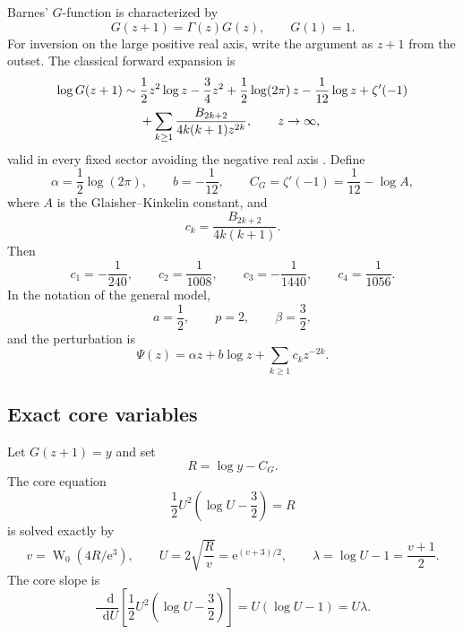 \documentclass[11pt,oneside]{article}
\theoremstyle{plain}
\theoremstyle{definition}
\theoremstyle{remark}
\newcommand{\W}{\operatorname{W}}
\newcommand{\e}{\mathrm{e}}
\newcommand{\dd}{\mathop{}\!\mathrm{d}}
\begin{document}
Barnes' \(G\)-function is characterized by
\begin{equation}
 G(z+1)=\Gamma(z)G(z),
 \qquad G(1)=1.
 \label{eq:barnes-recurrence-definition}
\end{equation}
For inversion on the large positive real axis, write the argument as \(z+1\)
from the outset.  The classical forward expansion is
\begin{align}
 \log G(z+1)\sim{}&
 \frac12z^2\log z-\frac34z^2
 +\frac12\log(2\pi)\,z
 -\frac1{12}\log z
 +\zeta'(-1)
 \notag\\
 &+\sum_{k\ge1}\frac{B_{2k+2}}{4k(k+1)z^{2k}},
 \qquad z\to\infty,
 \label{eq:barnes-forward}
\end{align}
valid in every fixed sector avoiding the negative real axis
\cite{DLMF517,NemesBarnes}.  Define
\begin{equation}
 \alpha=\frac12\log(2\pi),
 \qquad b=-\frac1{12},
 \qquad C_G=\zeta'(-1)=\frac1{12}-\log A,
 \label{eq:barnes-alpha-b-C}
\end{equation}
where \(A\) is the Glaisher--Kinkelin constant, and
\begin{equation}
 c_k=\frac{B_{2k+2}}{4k(k+1)}.
 \label{eq:barnes-ck}
\end{equation}
Then
\begin{equation}
 c_1=-\frac1{240},\qquad
 c_2=\frac1{1008},\qquad
 c_3=-\frac1{1440},\qquad
 c_4=\frac1{1056}.
 \label{eq:barnes-ck-first}
\end{equation}
In the notation of the general model,
\begin{equation}
 a=\frac12,
 \qquad p=2,
 \qquad \beta=\frac32,
 \label{eq:barnes-core-parameters}
\end{equation}
and the perturbation is
\begin{equation}
 \Psi(z)=\alpha z+b\log z+\sum_{k\ge1}c_kz^{-2k}.
 \label{eq:barnes-Psi}
\end{equation}

\subsection{Exact core variables}

Let \(G(z+1)=y\) and set
\begin{equation}
 R=\log y-C_G.
 \label{eq:barnes-R}
\end{equation}
The core equation
\begin{equation}
 \frac12U^2\left(\log U-\frac32\right)=R
 \label{eq:barnes-core-equation}
\end{equation}
is solved exactly by
\begin{equation}
 v=\W_0(4R/\e^3),
 \qquad
 U=2\sqrt{\frac{R}{v}}=\e^{(v+3)/2},
 \qquad
 \lambda=\log U-1=\frac{v+1}{2}.
 \label{eq:barnes-U-v-lambda}
\end{equation}
The core slope is
\begin{equation}
 \frac{\dd}{\dd U}
 \left[\frac12U^2\left(\log U-\frac32\right)\right]
 =U(\log U-1)=U\lambda.
 \label{eq:barnes-core-slope}
\end{equation}
\end{document}
